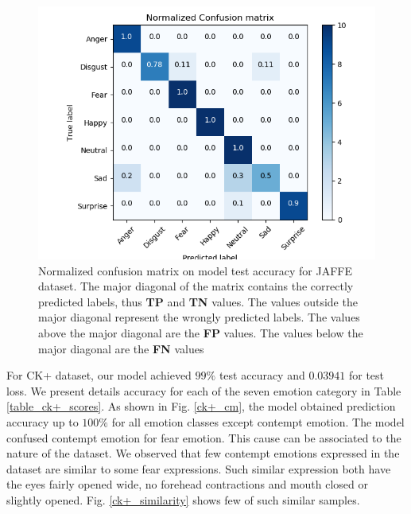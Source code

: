 \documentclass[master]{thesis-uestc}
\begin{document}
\begin{figure}[ht]
\includegraphics[width=5in]{pic/JAFFE_CM_normalized.png}
\caption{Normalized confusion matrix on model test accuracy for JAFFE dataset. The major diagonal of the matrix contains the correctly predicted labels, thus \textbf{TP} and \textbf{TN} values. The values outside the major diagonal represent the wrongly predicted labels. The values above the major diagonal are the \textbf{FP} values. The values below the major diagonal are the \textbf{FN} values}
\label{fig_jaffe_cm_scores}
\end{figure}

For CK+ dataset, our model achieved $99\%$ test accuracy and $0.03941$ for test loss. We present details accuracy for each of the seven emotion category in Table \ref{table_ck+_scores}. As shown in Fig. \ref{ck+_cm}, the model obtained prediction accuracy up to $100\%$ for all emotion classes except contempt emotion. The model confused contempt emotion for fear emotion. This cause can be associated to the nature of the dataset. We observed that few contempt emotions expressed in the dataset are similar to some fear expressions. Such similar expression both have the eyes fairly opened wide, no forehead contractions and mouth closed or slightly opened. Fig. \ref{ck+_similarity} shows few of such similar samples.
\end{document}
